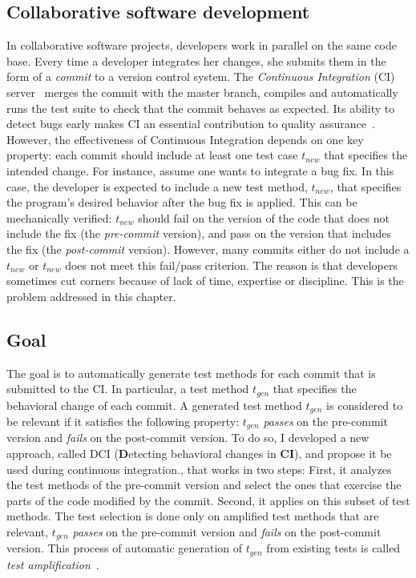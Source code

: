 \subsection{Collaborative software development} 
\label{subsec:dci:introduction:collaborative-software-development}
In collaborative software projects, developers work in parallel on the same code base. 
Every time a developer integrates her changes, she submits them in the form of a \emph{commit} to a version control system.
The \emph{Continuous Integration} (CI) server~\cite{fowler2006continuous} merges the commit with the master branch, compiles and automatically runs the test suite to check that the commit behaves as expected.
Its ability to detect bugs early makes CI an essential contribution to quality assurance~\cite{Hilton:2016:UsageCI,duvall2007continuous}.
However, the effectiveness of Continuous Integration depends on one key property: each commit should include at least one test case $t_{new}$ that specifies the intended change.
For instance, assume one wants to integrate a bug fix.
In this case, the developer is expected to include a new test method, $t_{new}$, that specifies the program's desired behavior after the bug fix is applied.
This can be mechanically verified: $t_{new}$ should fail on the version of the code that does not include the fix (the \emph{pre-commit} version), and pass on the version that includes the fix (the \emph{post-commit} version).
However, many commits either do not include a $t_{new}$ or $t_{new}$ does not meet this fail/pass criterion.
The reason is that developers sometimes cut corners because of lack of time, expertise or discipline. 
This is the problem addressed in this chapter.

\subsection{Goal}
\label{subsec:dci:introduction:goal}

The goal is to automatically generate test methods for each commit that is submitted to the CI.
In particular, a test method $t_{gen}$ that specifies the behavioral change of each commit.
A generated test method $t_{gen}$ is considered to be relevant if it satisfies the following property: 
$t_{gen}$ \textit{passes} on the pre-commit version and \textit{fails} on the post-commit version.
To do so, I developed a new approach, called DCI (\textbf{D}etecting behavioral changes in \textbf{CI}), and propose it be used during continuous integration., that works in two steps:
First, it analyzes the test methods of the pre-commit version and select the ones that exercise the parts of the code modified by the commit.
Second, it applies \dspot on this subset of test methods.
The test selection is done only on amplified test methods that are relevant, \ie $t_{gen}$ \textit{passes} on the pre-commit version and \textit{fails} on the post-commit version.
This process of automatic generation of $t_{gen}$ from existing tests is called \emph{test amplification}~\cite{zhang2012}.

